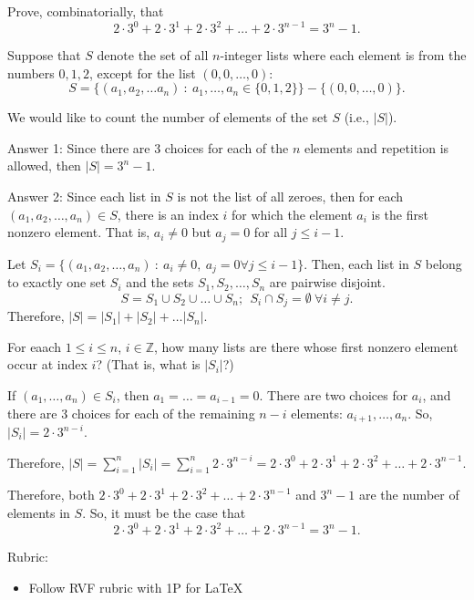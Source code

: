 \documentclass{article}
\newcommand{\Z}{\mathbb{Z}}
\theoremstyle{definition}
\begin{document}
\begin{question}
    Prove, combinatorially, that
    \[ 2 \cdot 3^0 + 2 \cdot 3^1 + 2 \cdot 3^2 + \ldots + 2 \cdot 3^{n-1} = 3^n - 1. \]
\end{question}
\begin{solution}
Suppose that $S$ denote the set of all $n$-integer lists where each element is from the numbers $0, 1, 2$, except for the list $(0, 0, \ldots, 0)$:
\[ S = \{ (a_1, a_2, \ldots a_n) ~:~ a_1, \ldots, a_n \in \{0, 1, 2\} \} - \{ (0, 0, \ldots, 0) \}. \]

We would like to count the number of elements of the set $S$ (i.e., $|S|$).

Answer 1: Since there are 3 choices for each of the $n$ elements and repetition is allowed, then $|S| = 3^n - 1$.

Answer 2: Since each list in $S$ is not the list of all zeroes, then for each $(a_1, a_2, \ldots, a_n) \in S$, there is an index $i$ for which the element $a_i$ is the first nonzero element.  That is, $a_i \neq 0$ but $a_j = 0$ for all $j \leq i-1$.

Let $S_i = \{(a_1, a_2, \ldots, a_n) ~:~ a_i \neq 0, ~ a_j = 0 \forall j \leq i-1\}$.  Then, each list in $S$ belong to exactly one set $S_i$
and the sets $S_1, S_2, \ldots, S_n$ are pairwise disjoint.
\[ S = S_1 \cup S_2 \cup \ldots \cup S_n; ~~ S_i \cap S_j = \emptyset \ \forall i \neq j.\]  
Therefore, $|S| = |S_1| + |S_2| + \ldots |S_n|$.

For eaach $1 \leq i \leq n$, $i\in \Z$, how many lists are there whose first nonzero element occur at index $i$?  (That is, what is $|S_i|$?)  

If $(a_1, \ldots, a_n) \in S_i$, then $a_1 = \ldots = a_{i-1} = 0$.  There are two choices for $a_i$, and there are 3 choices for each of the remaining $n-i$ elements: $a_{i+1}, \ldots, a_n$.  So, $|S_i| = 2 \cdot 3^{n-i}$.

Therefore, $|S| = \displaystyle\sum_{i=1}^n |S_i| = \sum_{i=1}^n 2\cdot 3^{n-i} = 2 \cdot 3^0 + 2 \cdot 3^1 + 2 \cdot 3^2 + \ldots + 2 \cdot 3^{n-1}$.

Therefore, both $2 \cdot 3^0 + 2 \cdot 3^1 + 2 \cdot 3^2 + \ldots + 2 \cdot 3^{n-1}$ and $3^n-1$ are the number of elements in $S$.  So, it must be the case that
\[2 \cdot 3^0 + 2 \cdot 3^1 + 2 \cdot 3^2 + \ldots + 2 \cdot 3^{n-1} = 3^n - 1. \]

{\color{red} Rubric:
\begin{itemize}
\item Follow RVF rubric with 1P for \LaTeX
\end{itemize}}
\end{solution}
\end{document}
